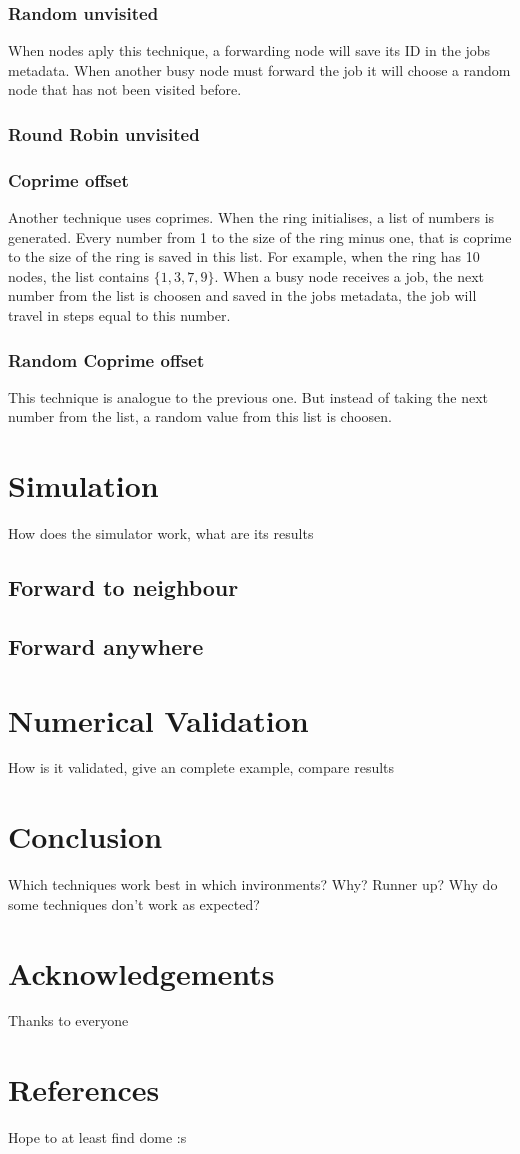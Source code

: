 \documentclass[10pt,a4paper,titlepage]{article}
\begin{document}
\subsubsection{Random unvisited}
When nodes aply this technique, a forwarding node will save its ID in the jobs metadata. When another busy node must forward the job it will choose a random node that has not been visited before.


\subsubsection{Round Robin unvisited}

\subsubsection{Coprime offset}
Another technique uses coprimes. When the ring initialises, a list of numbers is generated. Every number from 1 to the size of the ring minus one, that is coprime to the size of the ring is saved in this list. For example, when the ring has 10 nodes, the list contains $\{1, 3 , 7 , 9\}$. When a busy node receives a job, the next number from the list is choosen and saved in the jobs metadata, the job will travel in steps equal to this number.

\subsubsection{Random Coprime offset}
This technique is analogue to the previous one. But instead of taking the next number from the list, a random value from this list is choosen.


\section{Simulation}
How does the simulator work, what are its results
\subsection{Forward to neighbour}
\subsection{Forward anywhere}

\section{Numerical Validation}
How is it validated, give an complete example, compare results

\section{Conclusion}
Which techniques work best in which invironments? Why? Runner up? Why do some techniques don't work as expected?

\section*{Acknowledgements}
Thanks to everyone

\section*{References}
Hope to at least find dome :s
\end{document}
